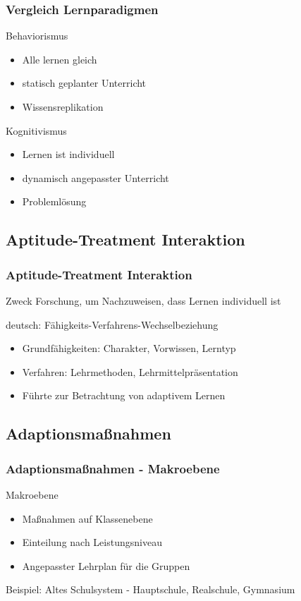 \documentclass{beamer}
\begin{document}
  \begin{frame}
  \frametitle{Vergleich Lernparadigmen}
    \begin{alertblock}{Behaviorismus}
     \begin{itemize}
       \item Alle lernen gleich
       \item statisch geplanter Unterricht
       \item Wissensreplikation
     \end{itemize}
    \end{alertblock}

    \begin{block}{Kognitivismus}
     \begin{itemize}
       \item Lernen ist individuell
       \item dynamisch angepasster Unterricht
       \item Problemlösung
     \end{itemize}
    \end{block}
  \end{frame}
\subsection{Aptitude-Treatment Interaktion}
\begin{frame}
  \frametitle{Aptitude-Treatment Interaktion}

  \begin{block}{Zweck}
    Forschung, um Nachzuweisen, dass Lernen individuell ist
  \end{block}

  \begin{block}{deutsch:}
    Fähigkeits-Verfahrens-Wechselbeziehung
  \end{block}

  \begin{itemize}
    \item Grundfähigkeiten: Charakter, Vorwissen, Lerntyp
    \item Verfahren: Lehrmethoden, Lehrmittelpräsentation
    \item Führte zur Betrachtung von adaptivem Lernen
  \end{itemize}
\end{frame}
\subsection{Adaptionsmaßnahmen}
\begin{frame}
  \frametitle{Adaptionsmaßnahmen - Makroebene}
  \begin{block}{Makroebene}
    \begin{itemize}
      \item Maßnahmen auf Klassenebene
      \item Einteilung nach Leistungsniveau
      \item Angepasster Lehrplan für die Gruppen
    \end{itemize}
  \end{block}

  Beispiel: Altes Schulsystem - Hauptschule, Realschule, Gymnasium
\end{frame}
\end{document}
